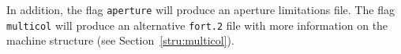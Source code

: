In addition, the flag \texttt{aperture} will produce an aperture limitations file.
The flag \texttt{multicol} will produce an alternative \texttt{fort.2} file with more information on the machine structure (see Section~\ref{stru:multicol}).







